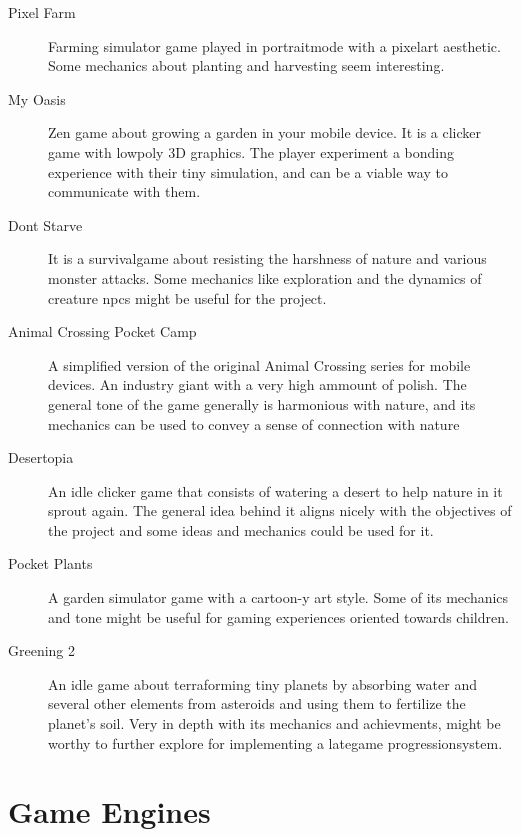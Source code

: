 \begin{description}

\item[Pixel Farm]{Farming simulator game played in \gls{portraitmode} with a \gls{pixelart}
aesthetic. Some mechanics about planting and harvesting seem interesting.}
\item[My Oasis]{Zen game about growing a garden in your mobile device. It is a \gls{clicker} game with \gls{lowpoly} 3D graphics. The player experiment a bonding experience with their tiny simulation, and can be a viable way to communicate with them.}

\item[Dont Starve]{It is a \gls{survivalgame} about resisting the harshness of nature and various monster attacks. Some mechanics like exploration and the dynamics of creature \glspl{npc} might be useful for the project.}

\item[Animal Crossing Pocket Camp]{A simplified version of the original Animal Crossing series for mobile devices. An industry giant with a very high ammount of polish. The general tone of the game generally is harmonious with nature, and its mechanics can be used to convey a sense of connection with nature}

\item[Desertopia]{An \gls{idle} \gls{clicker} game that consists of watering a desert to help nature in it sprout again. The general idea behind it aligns nicely with the objectives of the project and some ideas and mechanics could be used for it.}

\item[Pocket Plants]{A garden simulator game with a cartoon-y art style. Some of its mechanics and tone might be useful for gaming experiences oriented towards children.}

\item[Greening 2]{An \gls{idle} game about terraforming tiny planets by absorbing water and several other elements from asteroids and using them to fertilize the planet's soil. Very in depth with its mechanics and achievments, might be worthy to further explore for implementing a \gls{lategame} \gls{progressionsystem}.}

\end{description}

\section{Game Engines}

